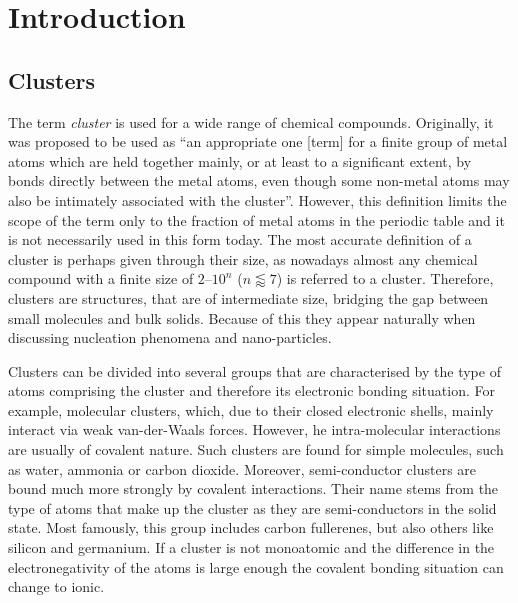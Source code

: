 
\part{Introduction}
\label{sec:introduction}

%
\chapter{Clusters}
\label{sec:clusters}

The term \emph{cluster} is used for a wide range of chemical compounds.
Originally, it was proposed to be used as ``an appropriate one [term] for a
finite group of metal atoms which are held together mainly, or at least to a
significant extent, by bonds directly between the metal atoms, even though some
non-metal atoms may also be intimately associated with the
cluster''.\autocite{Cotton_MetalAtomClusters_1964} However, this definition
limits the scope of the term only to the fraction of metal atoms in the periodic
table and it is not necessarily used in this form today. The most accurate
definition of a cluster is perhaps given through their size, as nowadays almost
any chemical compound with a finite size of $2$--$10^n$ ($n\lessapprox 7$) is
referred to a
cluster.\autocite{Johnston_Atomicmolecularclusters_2002,Wales_Energylandscapes_2003}
Therefore, clusters are structures, that are of intermediate size, bridging the
gap between small molecules and bulk solids. Because of this they appear
naturally when discussing nucleation phenomena and nano-particles.

Clusters can be divided into several groups that are characterised by the type
of atoms comprising the cluster and therefore its electronic bonding situation.
For example, molecular clusters, which, due to their closed electronic shells,
mainly interact via weak van-der-Waals forces. However, he intra-molecular
interactions are usually of covalent nature. Such clusters are found for simple
molecules, such as water,\autocite{Liu_WaterClusters_1996}
ammonia\autocite{Beu_Structureammoniaclusters_2001} or carbon
dioxide.\autocite{Takeuchi_GeometryOptimizationCarbon_2008} Moreover,
semi-conductor clusters are bound much more strongly by covalent interactions.
Their name stems from the type of atoms that make up the cluster as they are
semi-conductors in the solid state. Most famously, this group includes carbon
fullerenes\autocite{Kroto_stabilityfullerenesCn_1987}, but also others like
silicon\autocite{Zhu_Structuresstabilitiessmall_2003a} and
germanium.\autocite{Pacchioni_Silicongermaniumclusters_1986} If a cluster is not
monoatomic and the difference in the electronegativity of the atoms is large
enough the covalent bonding situation can change to ionic.

